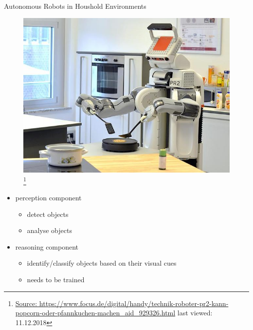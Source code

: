 \documentclass[]{beamer}
\begin{document}
\begin{frame}{Autonomous Robots in Houshold Environments}
	\begin{figure}
		\includegraphics[scale=.25]{img/pr2.jpg}\footnote{\tiny{\url{Source: https://www.focus.de/digital/handy/technik-roboter-pr2-kann-popcorn-oder-pfannkuchen-machen\_aid\_929326.html} last viewed: 11.12.2018}}
	\end{figure}
	\begin{itemize}
		\item perception component
			\begin{itemize}
				\item detect objects
				\item analyse objects
			\end{itemize}
		\item reasoning component
			\begin{itemize}
				\item identify/classify objects based on their visual cues
				\item needs to be trained
			\end{itemize}
	\end{itemize}
\end{frame}
\end{document}
